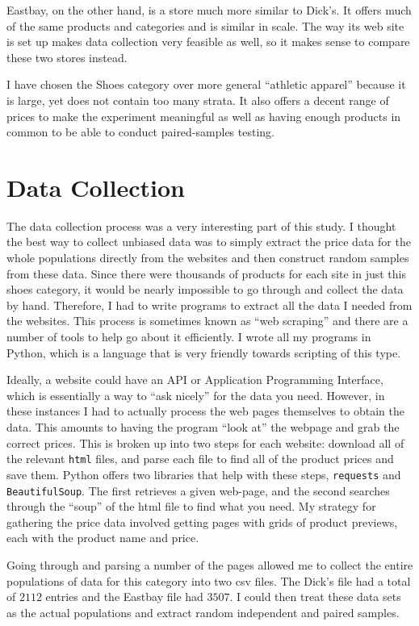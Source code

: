 \documentclass[12pt]{article}
\begin{document}
Eastbay, on the other hand, is a store much more similar to Dick's. It offers much of the same products and categories and is similar in scale. The way its web site is set up makes data
collection very feasible as well, so it makes sense to compare these two stores instead.

I have chosen the Shoes category over more general ``athletic apparel'' because it is large, yet does not contain too many strata. It also offers a decent range of prices to make the
experiment meaningful as well as having enough products in common to be able to conduct paired-samples testing.

\section{Data Collection}
The data collection process was a very interesting part of this study. I thought the best way to collect unbiased data was to simply extract the price data for the whole populations
 directly from the websites and then construct random samples from these data. Since there were thousands of products for each site in just this shoes category, it would be nearly impossible to go through and collect the data by hand. Therefore, I had to write programs to extract all the data I needed from the websites. This process is sometimes known as
 ``web scraping'' and there are a number of tools to help go about it efficiently. I wrote all my programs in Python, which is a language that is very friendly towards scripting of this type.
 
 Ideally, a website could have an API or Application Programming Interface, which is essentially a way to ``ask nicely'' for the data you need. However, in these instances I had to actually
 process the web pages themselves to obtain the data. This amounts to having the program ``look at'' the webpage and grab the correct prices. This is broken up into two steps
 for each website: download all of the relevant \texttt{html} files, and parse each file to find all of the product prices and save them. Python offers two libraries that help with these steps,
 \texttt{requests} and \texttt{BeautifulSoup}. The first retrieves a given web-page, and the second searches through the ``soup'' of the html file to find what you need. My strategy for gathering the price data involved getting pages with grids of product previews, each with the product name and price. 
 
 Going through and parsing a number of the pages allowed me to collect the entire populations of data for this category into two csv files. The Dick's file had a total of $2112$ entries
 and the Eastbay file had $3507$. I could then treat these data sets as the actual populations and extract random independent and paired samples. 
 
\end{document}
